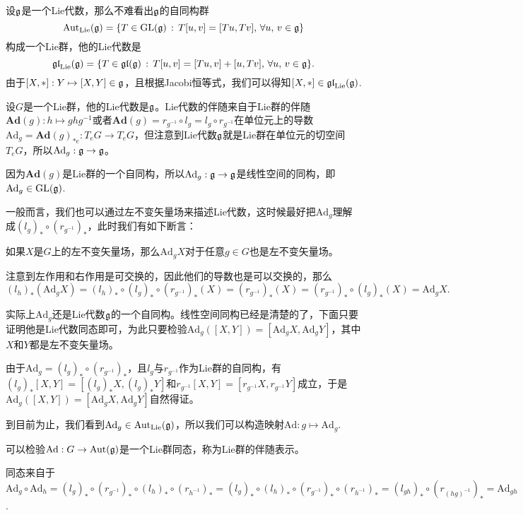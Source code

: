\para 设${\mathfrak{g}}$是一个Lie代数，那么不难看出${\mathfrak{g}}$的自同构群
\[\mathrm{Aut}_{\mathrm{Lie}}({\mathfrak{g}})=\{T\in \mathrm{GL}({\mathfrak{g}})\,:\,T[u,v]=[Tu,Tv],\,\forall u,\,v\in{\mathfrak{g}}\}\]
构成一个Lie群，他的Lie代数是
\[\mathfrak{gl}_{\mathrm{Lie}}({\mathfrak{g}})=\{T\in \mathfrak{gl}({\mathfrak{g}})\,:\,T[u,v]=[Tu,v]+[u,Tv],\,\forall u,\,v\in{\mathfrak{g}}\}.\]
由于$[X,*]:Y\mapsto [X,Y]\in {\mathfrak{g}}$，且根据Jacobi恒等式，我们可以得知$[X,*]\in \mathfrak{gl}_{\mathrm{Lie}}({\mathfrak{g}})$.

\para 设$G$是一个Lie群，他的Lie代数是${\mathfrak{g}}$。Lie代数的伴随来自于Lie群的伴随$\mathbf{Ad}(g):h\mapsto ghg^{-1}$或者$\mathbf{Ad}(g)=r_{g^{-1}}\circ l_g=l_g\circ r_{g^{-1}}$在单位元上的导数$\mathrm{Ad}_g=\mathbf{Ad}(g)_{*e}:T_eG\to T_eG$，但注意到Lie代数${\mathfrak{g}}$就是Lie群在单位元的切空间$T_eG$，所以$\mathrm{Ad}_g:{\mathfrak{g}}\to {\mathfrak{g}}$。

因为$\mathbf{Ad}(g)$是Lie群的一个自同构，所以$\mathrm{Ad}_g:{\mathfrak{g}}\to{\mathfrak{g}}$是线性空间的同构，即$\mathrm{Ad}_g\in \mathrm{GL}({\mathfrak{g}})$.

一般而言，我们也可以通过左不变矢量场来描述Lie代数，这时候最好把$\mathrm{Ad}_g$理解成$(l_g)_*\circ (r_{g^{-1}})_*$，此时我们有如下断言：

\para 如果$X$是$G$上的左不变矢量场，那么$\mathrm{Ad}_gX$对于任意$g\in G$也是左不变矢量场。

注意到左作用和右作用是可交换的，因此他们的导数也是可以交换的，那么
\[
	(l_h)_*(\mathrm{Ad}_gX)=(l_h)_*\circ (l_g)_*\circ (r_{g^{-1}})_*(X)=(r_{g^{-1}})_*(X)=(r_{g^{-1}})_*\circ (l_g)_*(X)=\mathrm{Ad}_gX.
\]

\para 实际上$\mathrm{Ad}_g$还是Lie代数${\mathfrak{g}}$的一个自同构。线性空间同构已经是清楚的了，下面只要证明他是Lie代数同态即可，为此只要检验$\mathrm{Ad}_g([X,Y])=[\mathrm{Ad}_gX,\mathrm{Ad}_gY]$，其中$X$和$Y$都是左不变矢量场。

由于$\mathrm{Ad}_g=(l_g)_*\circ (r_{g^{-1}})_*$，且$l_g$与$r_{g^{-1}}$作为Lie群的自同构，有$(l_g)_*[X,Y]=[(l_g)_*X,(l_g)_*Y]$和$r_{g^{-1}}[X,Y]=[r_{g^{-1}}X,r_{g^{-1}}Y]$成立，于是$\mathrm{Ad}_g([X,Y])=[\mathrm{Ad}_gX,\mathrm{Ad}_gY]$自然得证。

到目前为止，我们看到$\mathrm{Ad}_g\in \mathrm{Aut}_{\mathrm{Lie}}({\mathfrak{g}})$，所以我们可以构造映射$\mathrm{Ad}:g\mapsto \mathrm{Ad}_g$.

\para 可以检验$\mathrm{Ad}:G\to \mathrm{Aut}({\mathfrak{g}})$是一个Lie群同态，称为Lie群的伴随表示。

同态来自于$\mathrm{Ad}_g\circ \mathrm{Ad}_h=(l_g)_*\circ (r_{g^{-1}})_*\circ (l_h)_*\circ (r_{h^{-1}})_*=(l_g)_*\circ (l_h)_*\circ (r_{g^{-1}})_*\circ (r_{h^{-1}})_*=(l_{gh})_*\circ (r_{(hg)^{-1}})_*=\mathrm{Ad}_{gh}$.

